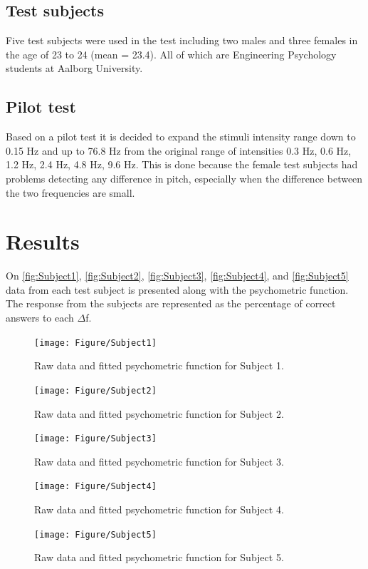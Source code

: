 \subsection*{Test subjects}
%
Five test subjects were used in the test including two males and three females in the age of 23 to 24 (mean = 23.4). All of which are Engineering Psychology students at Aalborg University.

\subsection*{Pilot test}
%
Based on a pilot test it is decided to expand the stimuli intensity range down to 0.15 Hz and up to 76.8 Hz from the original range of intensities 0.3 Hz, 0.6 Hz, 1.2 Hz, 2.4 Hz, 4.8 Hz, 9.6 Hz. This is done because the female test subjects had problems detecting any difference in pitch, especially when the difference between the two frequencies are small.

\section*{Results}
%
On \autoref{fig:Subject1}, \autoref{fig:Subject2}, \autoref{fig:Subject3}, \autoref{fig:Subject4}, and \autoref{fig:Subject5} data from each test subject is presented along with the psychometric function. The response from the subjects are represented as the percentage of correct answers to each $\Delta$f.
% 
\begin{figure}[H]
\centering
\texttt{[image: Figure/Subject1]} 
\caption{Raw data and fitted psychometric function for Subject 1.}
\label{fig:Subject1}
\end{figure}
%
\begin{figure}[H]
\centering
\texttt{[image: Figure/Subject2]} 
\caption{Raw data and fitted psychometric function for Subject 2.}
\label{fig:Subject2}
\end{figure}
%
\begin{figure}[H]
\centering
\texttt{[image: Figure/Subject3]} 
\caption{Raw data and fitted psychometric function for Subject 3.}
\label{fig:Subject3}
\end{figure}
%
\begin{figure}[H]
\centering
\texttt{[image: Figure/Subject4]} 
\caption{Raw data and fitted psychometric function for Subject 4.}
\label{fig:Subject4}
\end{figure}
%
\begin{figure}[H]
\centering
\texttt{[image: Figure/Subject5]} 
\caption{Raw data and fitted psychometric function for Subject 5.}
\label{fig:Subject5}
\end{figure}


